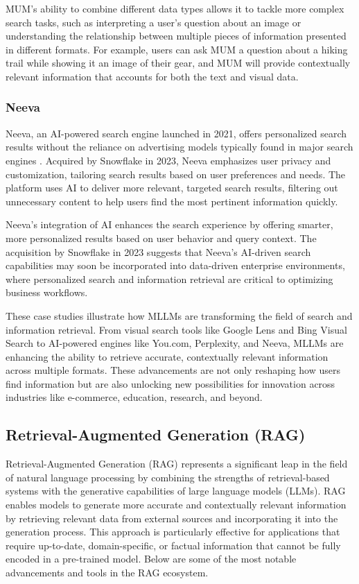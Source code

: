MUM's ability to combine different data types allows it to tackle more complex search tasks, such as interpreting a user's question about an image or understanding the relationship between multiple pieces of information presented in different formats. 
For example, users can ask MUM a question about a hiking trail while showing it an image of their gear, and MUM will provide contextually relevant information that accounts for both the text and visual data.

\subsubsection{Neeva}

Neeva, an AI-powered search engine launched in 2021, offers personalized search results without the reliance on advertising models typically found in major search engines \cite{Neeva}. 
Acquired by Snowflake in 2023, Neeva emphasizes user privacy and customization, tailoring search results based on user preferences and needs. 
The platform uses AI to deliver more relevant, targeted search results, filtering out unnecessary content to help users find the most pertinent information quickly.

Neeva's integration of AI enhances the search experience by offering smarter, more personalized results based on user behavior and query context. 
The acquisition by Snowflake in 2023 suggests that Neeva's AI-driven search capabilities may soon be incorporated into data-driven enterprise environments, where personalized search and information retrieval are critical to optimizing business workflows.

These case studies illustrate how MLLMs are transforming the field of search and information retrieval. 
From visual search tools like Google Lens and Bing Visual Search to AI-powered engines like You.com, Perplexity, and Neeva, MLLMs are enhancing the ability to retrieve accurate, contextually relevant information across multiple formats. 
These advancements are not only reshaping how users find information but are also unlocking new possibilities for innovation across industries like e-commerce, education, research, and beyond.

\subsection{Retrieval-Augmented Generation (RAG)}

Retrieval-Augmented Generation (RAG) represents a significant leap in the field of natural language processing by combining the strengths of retrieval-based systems with the generative capabilities of large language models (LLMs). 
RAG enables models to generate more accurate and contextually relevant information by retrieving relevant data from external sources and incorporating it into the generation process. 
This approach is particularly effective for applications that require up-to-date, domain-specific, or factual information that cannot be fully encoded in a pre-trained model. 
Below are some of the most notable advancements and tools in the RAG ecosystem.

